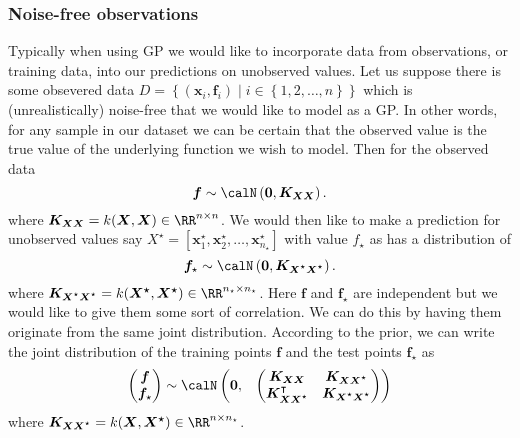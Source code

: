 \subsubsection{Noise-free observations}\label{Section1.4.1}
Typically when using GP we would like to incorporate data from observations, or training data, into our predictions on unobserved values.
Let us suppose there is some obsevered data $D = \left\{ (\bm{x}_i, \bm{f}_i) \mid i \in \left\{ 1,2, \ldots , n \right\} \right\}$ which is (unrealistically) noise-free that we would like to model as a GP. In other words, for any sample in our dataset we can be certain that the observed value is the true value of the underlying function we wish to model. Then for the observed data
\[
    \bm{f} \sim \calN \left( \bm{0}, \bm{K_{XX}} \right).
\]
where $\bm{K_{XX}} = k(\bm{X}, \bm{X}) \in \RR^{n \times n}$. We would then like to make a prediction for unobserved values say $X^{\star} = \left[ \bm{x}_1^{\star}, \bm{x}_2^{\star}, \ldots , \bm{x}_{n_\star}^{\star} \right]$ with value $f_{\star}$ as has a distribution of
\[
    \bm{f}_{\star} \sim \calN \left( \bm{0}, \bm{K_{X^{\star}X^{\star}}} \right).
\]
where $\bm{K_{X^{\star}X^{\star}}} = k(\bm{X^{\star}}, \bm{X^{\star}}) \in \RR^{n_\star \times n_\star}$. Here $\bm{f}$ and $\bm{f}_{\star}$ are independent but we would like to give them some sort of correlation. We can do this by having them originate from the same joint distribution. According to the prior, we can write the joint distribution of the training points $\bm{f}$ and the test points $\bm{f}_{\star}$ as
\[
    \begin{pmatrix}
        \bm{f} \\
        \bm{f}_{\star}
    \end{pmatrix}
    \sim \calN
    \begin{pmatrix}
        \bm{0}, &
        {
                \begin{pmatrix}
                    \bm{K_{XX}}                     & \bm{K_{XX^{\star}}}         \\
                    \bm{K_{XX^{\star}}}^{\intercal} & \bm{K_{X^{\star}X^{\star}}}
                \end{pmatrix}
            }
    \end{pmatrix}
\]
where $\bm{K_{XX^{\star}}} = k(\bm{X}, \bm{X^{\star}}) \in \RR^{n \times n_\star}$.

